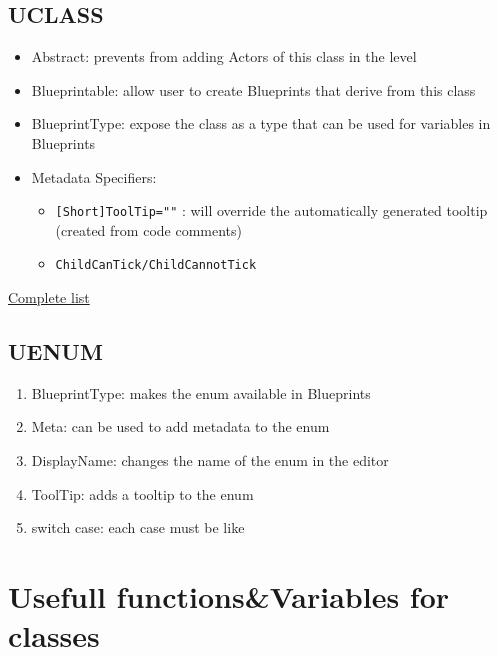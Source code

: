         \subsection{UCLASS}
            \begin{itemize}
                \item Abstract: prevents from adding Actors of this class in the level
                \item Blueprintable: allow user to create Blueprints that derive from this class
                \item BlueprintType: expose the class as a type that can be used for variables in Blueprints
                \item Metadata Specifiers:
                \begin{itemize}
                    \item \colorbox{mygray}{\lstinline{[Short]ToolTip=""}} : will override the automatically generated tooltip (created from code comments)
                    \item \colorbox{mygray}{\lstinline{ChildCanTick/ChildCannotTick}}
                \end{itemize}
            \end{itemize}
            \href{https://docs.unrealengine.com/en-US/Programming/UnrealArchitecture/Reference/Classes/Specifiers/index.html}{Complete list}


        \subsection{UENUM}
            \begin{enumerate}
                \item BlueprintType: makes the enum available in Blueprints
                \item Meta: can be used to add metadata to the enum
                \item DisplayName: changes the name of the enum in the editor
                \item ToolTip: adds a tooltip to the enum
                \item switch case: each case must be like 
            \end{enumerate}

    \section{Usefull functions\&Variables for classes}
